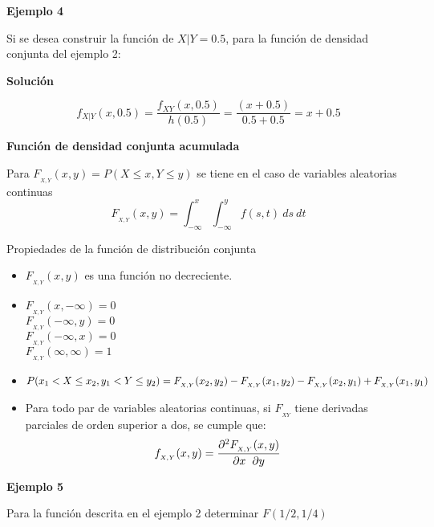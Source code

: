 \documentclass[base=hide,12pt]{elegantbook}
\begin{document}
\textcolor{col3}{\bf \large Ejemplo 4} 

Si se desea construir la función de $X|Y=0.5$, para la función de densidad conjunta del ejemplo 2:\\
\vspace{.5cm} 

\textcolor{col3}{\bf \large Solución}

$$f {_{X|Y}}(x,0.5)= \dfrac{f_{XY}(x,0.5)}{h(0.5)}= \dfrac{(x+0.5)}{0.5+0.5} = x+0.5$$



\vspace{1cm} 
\textcolor{col4}{\large \bf Función de densidad conjunta acumulada}

Para $F_{_{X,Y}}(x,y)=P(X\leq x, Y\leq y)$ se tiene en el caso de variables aleatorias continuas
$$F_{_{X,Y}}(x,y)=\int_{-\infty}^{x} \int_{-\infty}^{y} f(s,t) \:ds \:dt$$


\begin{Box2}{Propiedades de la función de distribución conjunta}
\begin{itemize}
	\item $F_{_{X,Y}}(x,y)$ es una función no decreciente.
	\item $F_{_{X,Y}}(x,-\infty)=0$\\
	$F_{_{X,Y}}(-\infty,y)=0$\\
	$F_{_{X,Y}}(-\infty,x)=0$\\
	$F_{_{X,Y}}(\infty,\infty)=1$
	
	\item $P(x_1<X\leq x_2, y_1<Y\leq y_2)=\\F_{_{X,Y}}(x_2,y_2)-F_{_{X,Y}}(x_1,y_2)-F_{_{X,Y}}(x_2,y_1)+F_{_{X,Y}}(x_1,y_1)$	
	\item Para todo par de variables aleatorias continuas, si $F_{_{XY}}$ tiene derivadas parciales de orden superior a dos, se cumple que:
	\[f_{_{X,Y}}(x,y)=\frac{\partial^{2} F_{_{X,Y}}(x,y)}{\partial x \hspace{.2cm}\partial y}\]
\end{itemize}
\end{Box2}

\textcolor{col3}{\bf \large Ejemplo 5}

Para la función descrita en el ejemplo 2 determinar $F(1/2, 1/4)$
\end{document}
